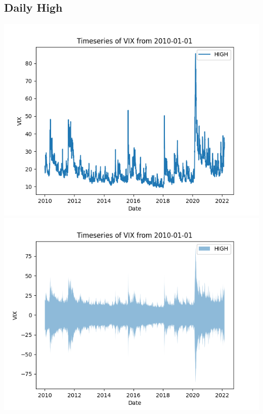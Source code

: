 \documentclass{article}
\begin{document}
\subsection{Daily High}
\begin{center}
    \includegraphics{VIX_High_Timeseries_2010}
    \includegraphics{VIX_High_Timeseries_Fill_2010}
\end{center}
\end{document}
